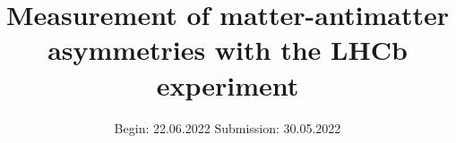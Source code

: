 


\title{Measurement of matter-antimatter asymmetries with the LHCb experiment}
\date{%
  Begin: 22.06.2022
  \hspace{3em}
  Submission:  30.05.2022
}



\maketitle
\thispagestyle{empty}
\tableofcontents
\newpage






\printbibliography{}


